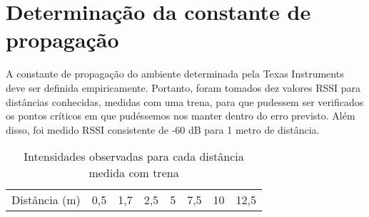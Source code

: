 \chapter{Determinação da constante de propagação}

A constante de propagação do ambiente determinada pela Texas Instruments deve ser definida empiricamente. Portanto, foram tomados dez valores RSSI para distâncias conhecidas, medidas com uma trena, para que pudessem ser verificados os pontos críticos em que pudéssemos nos manter dentro do erro previsto. Além disso, foi medido RSSI consistente de -60 dB para 1 metro de distância.

\begin{table}[ht]
\centering
\caption{Intensidades observadas para cada distância medida com trena}
\vspace{0.5cm}
\begin{tabular}{l|ccccccc}
\hline
Distância (m) & 0,5 & 1,7 & 2,5 & 5 & 7,5 & 10 & 12,5 \vspace{0.4cm}\\


\end{tabular}
\end{table}
